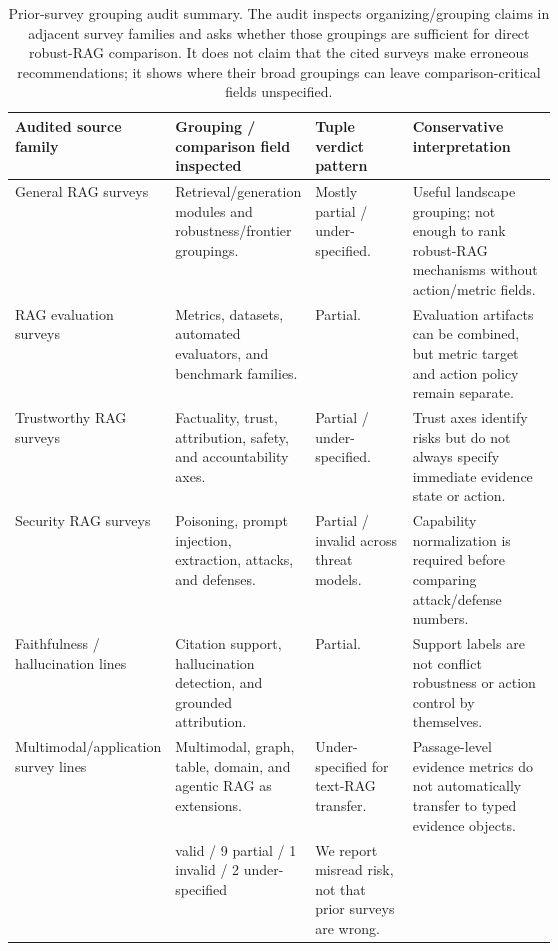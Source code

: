 \documentclass[11pt]{article}
\begin{document}
\begin{table}[t]
\centering
\scriptsize
\renewcommand{\arraystretch}{0.9}
\begin{tabularx}{\linewidth}{>{\raggedright\arraybackslash}p{0.23\linewidth}>{\raggedright\arraybackslash}p{0.22\linewidth}>{\raggedright\arraybackslash}p{0.18\linewidth}X}
\toprule
\textbf{Audited source family} & \textbf{Grouping / comparison field inspected} & \textbf{Tuple verdict pattern} & \textbf{Conservative interpretation} \\
\midrule
General RAG surveys & Retrieval/generation modules and robustness/frontier groupings. & Mostly partial / under-specified. & Useful landscape grouping; not enough to rank robust-RAG mechanisms without action/metric fields. \\
RAG evaluation surveys & Metrics, datasets, automated evaluators, and benchmark families. & Partial. & Evaluation artifacts can be combined, but metric target and action policy remain separate. \\
Trustworthy RAG surveys & Factuality, trust, attribution, safety, and accountability axes. & Partial / under-specified. & Trust axes identify risks but do not always specify immediate evidence state or action. \\
Security RAG surveys & Poisoning, prompt injection, extraction, attacks, and defenses. & Partial / invalid across threat models. & Capability normalization is required before comparing attack/defense numbers. \\
Faithfulness / hallucination lines & Citation support, hallucination detection, and grounded attribution. & Partial. & Support labels are not conflict robustness or action control by themselves. \\
Multimodal/application survey lines & Multimodal, graph, table, domain, and agentic RAG as extensions. & Under-specified for text-RAG transfer. & Passage-level evidence metrics do not automatically transfer to typed evidence objects. \\
\midrule
\multicolumn{2}{l}{Initial audited grouping sample (12 grouping claims)} & 0 valid / 9 partial / 1 invalid / 2 under-specified & We report misread risk, not that prior surveys are wrong. \\
\bottomrule
\end{tabularx}
\caption{Prior-survey grouping audit summary. The audit inspects organizing/grouping claims in adjacent survey families and asks whether those groupings are sufficient for direct robust-RAG comparison. It does not claim that the cited surveys make erroneous recommendations; it shows where their broad groupings can leave comparison-critical fields unspecified.}
\label{tab:prior-survey-claim-audit-summary}
\end{table}
\end{document}
